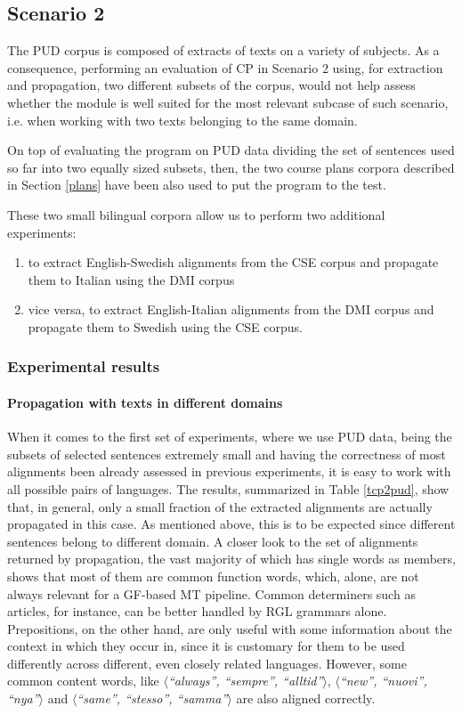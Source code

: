 \subsection{Scenario 2}

The PUD corpus is composed of extracts of texts on a variety of subjects. As a consequence, performing an evaluation of CP in Scenario 2 using, for extraction and propagation, two different subsets of the corpus, would not help assess whether the module is well suited for the most relevant subcase of such scenario, i.e. when working with two texts belonging to the same domain. \smallskip

On top of evaluating the program on PUD data dividing the set of sentences used so far into two equally sized subsets, then, the two course plans corpora described in Section \ref{plans} have been also used to put the program to the test. \smallskip

These two small bilingual corpora allow us to perform two additional experiments: \smallskip
\begin{enumerate}
    \item to extract English-Swedish alignments from the CSE corpus and propagate them to Italian using the DMI corpus
    \item vice versa, to extract English-Italian alignments from the DMI corpus and propagate them to Swedish using the CSE corpus.
\end{enumerate} \smallskip

\subsubsection{Experimental results}

\paragraph{Propagation with texts in different domains}
When it comes to the first set of experiments, where we use PUD data, being the subsets of selected sentences extremely small and having the correctness of most alignments been already assessed in previous experiments, it is easy to work with all possible pairs of languages. The results, summarized in Table \ref{tcp2pud}, show that, in general, only a small fraction of the extracted alignments are actually propagated in this case. As mentioned above, this is to be expected since different sentences belong to different domain. A closer look to the set of alignments returned by propagation, the vast majority of which has single words as members, shows that most of them are common function words, which, alone, are not always relevant for a GF-based MT pipeline. 
Common determiners such as articles, for instance, can be better handled by RGL grammars alone. 
Prepositions, on the other hand, are only useful with some information about the context in which they occur in, since it is customary for them to be used differently across different, even closely related languages. 
However, some common content words, like $\langle$\textit{``always'', ``sempre'', ``alltid''}$\rangle$, $\langle$\textit{``new'', ``nuovi'', ``nya''}$\rangle$ and $\langle$\textit{``same'', ``stesso'', ``samma''}$\rangle$ are also aligned correctly.

